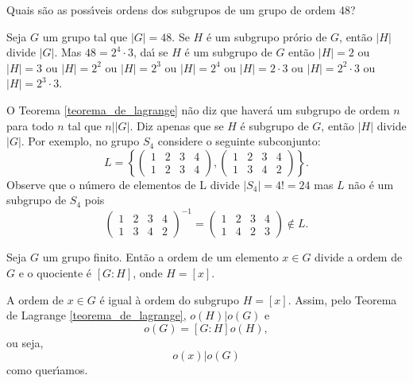 \begin{exemplo}
    Quais s{\~a}o as poss{\'\i}veis ordens dos subgrupos de um grupo de ordem 48?
    \begin{solucao}
        Seja $G$ um grupo tal que $|G|=48$. Se $H$ {\'e} um subgrupo pr\'orio de $G$, ent{\~a}o $|H|$ divide $|G|$. Mas $48=2^{4}\cdot 3$, da{\'\i} se $H$ \'e um subgrupo de $G$ ent\~ao $|H|=2$ ou $|H|=3$ ou $|H|= 2^{2}$ ou $|H|=2^{3}$ ou $|H|=2^{4}$ ou $|H|=2\cdot3$ ou $|H|=2^2\cdot 3$ ou $|H|=2^3\cdot 3$.
    \end{solucao}
\end{exemplo}

\begin{observacao}
    O Teorema \ref{teorema_de_lagrange} n{\~a}o diz que haver{\'a} um subgrupo de ordem $n$ para todo $n$ tal que $n||G|$. Diz apenas que se $H$ {\'e} subgrupo de $G$, ent{\~a}o $|H|$ divide $|G|$. Por exemplo, no grupo $S_4$ considere o seguinte subconjunto:
            \[
                L = \left\{\begin{pmatrix}
                    1 & 2 & 3 & 4\\
                    1 & 2 & 3 & 4
                \end{pmatrix}, \begin{pmatrix}
                    1 & 2 & 3 & 4\\
                    1 & 3 & 4 & 2
                \end{pmatrix}\right\}.
            \]
            Observe que o n\'umero de elementos de L divide $|S_4| = 4! = 24$ mas $L$ n\~ao \'e um subgrupo de $S_4$ pois
            \[
                \begin{pmatrix}
                    1 & 2 & 3 & 4\\
                    1 & 3 & 4 & 2
                \end{pmatrix}^{-1} = \begin{pmatrix}
                    1 & 2 & 3 & 4\\
                    1 & 4 & 2 & 3
                \end{pmatrix} \notin L.
            \]
\end{observacao}

\begin{corolario}\label{primeiro_coralario_Lagrange}
    Seja $G$ um grupo finito. Ent\~ao a ordem de um elemento $x \in G$ divide a ordem de $G$ e o quociente \'e $[G : H]$, onde $H = [x]$.
\end{corolario}
\begin{prova}
    A ordem de $x \in G$ \'e igual \`a ordem do subgrupo $H = [x]$. Assim, pelo Teorema de Lagrange \eqref{teorema_de_lagrange}, $o(H) | o(G)$ e
    \[
        o(G) = [G : H]o(H),
    \]
    ou seja,
    \[
        o(x) | o(G)
    \]
    como quer{\'\i}amos.
\end{prova}

